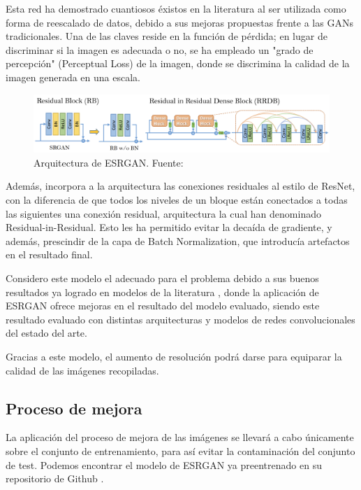 Esta red ha demostrado cuantiosos éxistos en la literatura al ser utilizada como forma de reescalado de datos, debido a sus mejoras propuestas frente a las GANs tradicionales. Una de las claves reside en la función de pérdida; en lugar de discriminar si la imagen es adecuada o no, se ha empleado un "grado de percepción" (Perceptual Loss) de la imagen, donde se discrimina la calidad de la imagen generada en una escala. \\

\begin{figure}[H]
	\centering
	\label {fig:esrgan}
	\includegraphics[scale = 0.2]{imagenes/esrgan.png}
	\caption{Arquitectura de ESRGAN. Fuente: \cite{wang2018esrgan}}
\end{figure}


Además, incorpora a la arquitectura las conexiones residuales al estilo de ResNet, con la diferencia de que todos los niveles de un bloque están conectados a todas las siguientes una conexión residual, arquitectura la cual han denominado Residual-in-Residual. Esto les ha permitido evitar la decaída de gradiente, y además, prescindir de la capa de Batch Normalization, que introducía artefactos en el resultado final.

Considero este modelo el adecuado para el problema debido a sus buenos resultados ya logrado en modelos de la literatura \cite{healthcare10071183}, donde la aplicación de ESRGAN ofrece mejoras en el resultado del modelo evaluado, siendo este resultado evaluado con distintas arquitecturas y modelos de redes convolucionales del estado del arte.

Gracias a este modelo, el aumento de resolución podrá darse para equiparar la calidad de las imágenes recopiladas.

\subsection{Proceso de mejora}

La aplicación del proceso de mejora de las imágenes se llevará a cabo únicamente sobre el conjunto de entrenamiento, para así evitar la contaminación del conjunto de test. Podemos encontrar el modelo de ESRGAN ya preentrenado en su repositorio de Github \cite{gitesrgan}.

